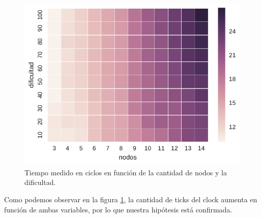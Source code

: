 \begin{figure}[H]
  \begin{center}
    \includegraphics{../experimentacion/ej1/ej1_conHeuristica.pdf}
    \caption{Tiempo medido en ciclos en función de la cantidad de nodos y la dificultad.}
    \label{fig:ej1_conHeuristica}
  \end{center}
\end{figure}

Como podemos observar en la figura \ref{fig:ej1_conHeuristica}, la cantidad de ticks del clock aumenta en función de ambas variables, por lo que nuestra hipótesis está confirmada.